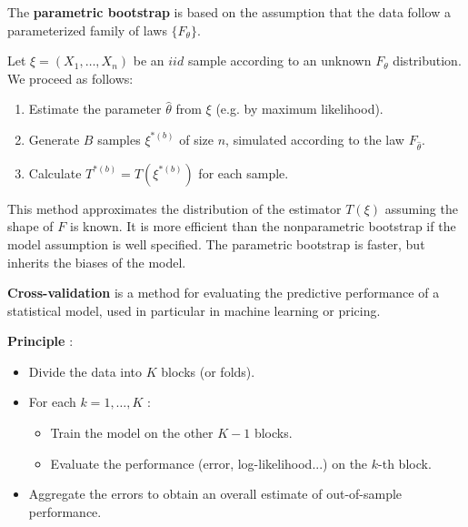 \begin{f}
	
	The \textbf{parametric bootstrap} is based on the assumption that the data follow a parameterized family of laws \(\{F_\theta\}\).
	
	Let \(\xi = (X_1, \ldots, X_n)\) be an \(iid\) sample according to an unknown \(F_\theta\) distribution. We proceed as follows:
	\begin{enumerate}
		\item Estimate the parameter \(\hat{\theta}\) from \(\xi\) (e.g. by maximum likelihood).
		\item Generate \(B\) samples \(\xi^{\ast(b)}\) of size \(n\), simulated according to the law \(F_{\hat{\theta}}\).
		\item Calculate \(T^{\ast(b)} = T(\xi^{\ast(b)})\) for each sample.
	\end{enumerate}
	
	This method approximates the distribution of the estimator \(T(\xi)\) assuming the shape of \(F\) is known. It is more efficient than the nonparametric bootstrap if the model assumption is well specified. The parametric bootstrap is faster, but inherits the biases of the model.
	
\end{f}

\begin{f}
	
	\textbf{Cross-validation} is a method for evaluating the predictive performance of a statistical model, used in particular in machine learning or pricing.
	
	\textbf{Principle} :
	\begin{itemize}
		\item Divide the data into \(K\) blocks (or folds).
		\item For each \(k = 1,\ldots,K\) :
		\begin{itemize}
			\item Train the model on the other \(K-1\) blocks.
			\item Evaluate the performance (error, log-likelihood...) on the \(k\)-th block.
		\end{itemize}
		\item Aggregate the errors to obtain an overall estimate of out-of-sample performance.
	\end{itemize}
	
\end{f}

